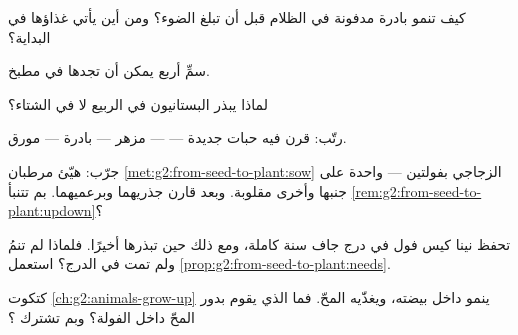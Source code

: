 \begin{exercise}[$\star$]\label{exo:g2:from-seed-to-plant:4}
كيف تنمو بادرة مدفونة في الظلام قبل أن تبلغ الضوء؟ ومن أين يأتي
غذاؤها في البداية؟
\end{exercise}

\begin{exercise}[$\star$]\label{exo:g2:from-seed-to-plant:5}
سمِّ أربع  يمكن أن تجدها في مطبخ.
\end{exercise}

\begin{exercise}[$\star$]\label{exo:g2:from-seed-to-plant:6}
لماذا يبذر البستانيون في الربيع لا في الشتاء؟
\end{exercise}

\begin{exercise}[$\star$]\label{exo:g2:from-seed-to-plant:7}
رتّب: قرن فيه حبات جديدة ---  ---  مزهر --- بادرة ---
 مورق.
\end{exercise}

\begin{exercise}[$\star$]\label{exo:g2:from-seed-to-plant:8}
جرّب: هيّئ مرطبان \cref{met:g2:from-seed-to-plant:sow} الزجاجي
بفولتين --- واحدة على جنبها وأخرى مقلوبة. وبعد  قارن
جذريهما وبرعميهما. بم تتنبأ \cref{rem:g2:from-seed-to-plant:updown}؟
\end{exercise}

\begin{exercise}[$\star\star$]\label{exo:g2:from-seed-to-plant:9}
تحفظ نينا كيس  فول في درج جاف سنة كاملة، ومع ذلك  حين
تبذرها أخيرًا. فلماذا لم تنمُ ولم تمت في الدرج؟ استعمل
\cref{prop:g2:from-seed-to-plant:needs}.
\end{exercise}

\begin{exercise}[$\star\star$]\label{exo:g2:from-seed-to-plant:10}
كتكوت \cref{ch:g2:animals-grow-up} ينمو داخل بيضته، ويغذّيه المحّ.
فما الذي يقوم بدور المحّ داخل الفولة؟ وبم تشترك  ؟
\end{exercise}
